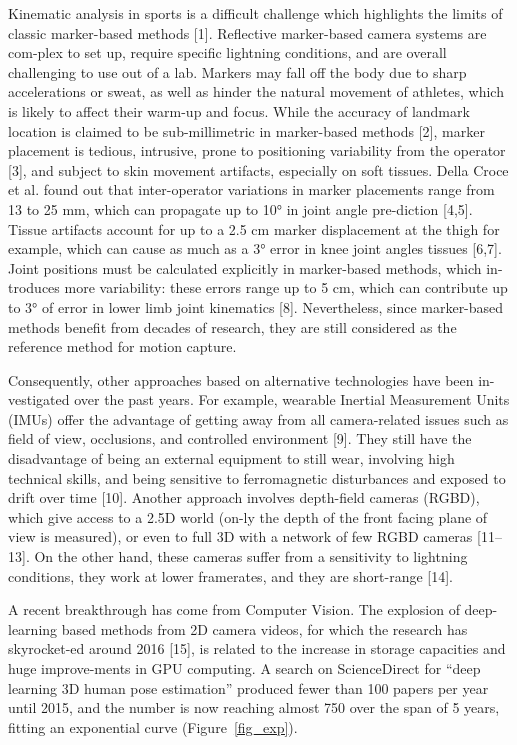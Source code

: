 Kinematic analysis in sports is a difficult challenge which highlights the limits of classic marker-based methods [1]. Reflective marker-based camera systems are com-plex to set up, require specific lightning conditions, and are overall challenging to use out of a lab. Markers may fall off the body due to sharp accelerations or sweat, as well as hinder the natural movement of athletes, which is likely to affect their warm-up and focus. While the accuracy of landmark location is claimed to be sub-millimetric in marker-based methods [2], marker placement is tedious, intrusive, prone to positioning variability from the operator [3], and subject to skin movement artifacts, especially on soft tissues. Della Croce et al. found out that inter-operator variations in marker placements range from 13 to 25 mm, which can propagate up to 10° in joint angle pre-diction [4,5].  Tissue artifacts account for up to a 2.5 cm marker displacement at the thigh for example, which can cause as much as a 3° error in knee joint angles tissues [6,7]. Joint positions must be calculated explicitly in marker-based methods, which in-troduces more variability: these errors range up to 5 cm, which can contribute up to 3° of error in lower limb joint kinematics [8]. Nevertheless, since marker-based methods benefit from decades of research, they are still considered as the reference method for motion capture.

Consequently, other approaches based on alternative technologies have been in-vestigated over the past years. For example, wearable Inertial Measurement Units (IMUs) offer the advantage of getting away from all camera-related issues such as field of view, occlusions, and controlled environment [9]. They still have the disadvantage of being an external equipment to still wear, involving high technical skills, and being sensitive to ferromagnetic disturbances and exposed to drift over time [10]. Another approach involves depth-field cameras (RGBD), which give access to a 2.5D world (on-ly the depth of the front facing plane of view is measured), or even to full 3D with a network of few RGBD cameras [11–13]. On the other hand, these cameras suffer from a sensitivity to lightning conditions, they work at lower framerates, and they are short-range [14]. 

A recent breakthrough has come from Computer Vision. The explosion of deep-learning based methods from 2D camera videos, for which the research has skyrocket-ed around 2016 [15], is related to the increase in storage capacities and huge improve-ments in GPU computing. A search on ScienceDirect for “deep learning 3D human pose estimation” produced fewer than 100 papers per year until 2015, and the number is now reaching almost 750 over the span of 5 years, fitting an exponential curve (Figure~\ref{fig_exp}).

